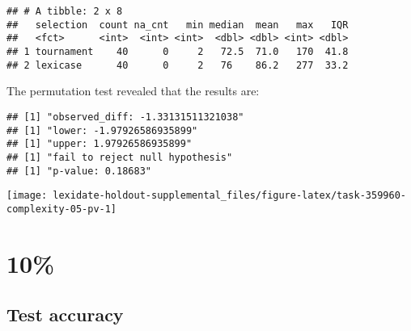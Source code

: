 \documentclass[
]{book}
\newenvironment{Shaded}{\begin{snugshade}}{\end{snugshade}}
\newcommand{\AttributeTok}[1]{\textcolor[rgb]{0.13,0.29,0.53}{#1}}
\newcommand{\DecValTok}[1]{\textcolor[rgb]{0.00,0.00,0.81}{#1}}
\newcommand{\FunctionTok}[1]{\textcolor[rgb]{0.13,0.29,0.53}{\textbf{#1}}}
\newcommand{\NormalTok}[1]{#1}
\newcommand{\OtherTok}[1]{\textcolor[rgb]{0.56,0.35,0.01}{#1}}
\newcommand{\SpecialCharTok}[1]{\textcolor[rgb]{0.81,0.36,0.00}{\textbf{#1}}}
\newcommand{\StringTok}[1]{\textcolor[rgb]{0.31,0.60,0.02}{#1}}
\begin{document}
\begin{verbatim}
## # A tibble: 2 x 8
##   selection  count na_cnt   min median  mean   max   IQR
##   <fct>      <int>  <int> <int>  <dbl> <dbl> <int> <dbl>
## 1 tournament    40      0     2   72.5  71.0   170  41.8
## 2 lexicase      40      0     2   76    86.2   277  33.2
\end{verbatim}

The permutation test revealed that the results are:

\begin{Shaded}
\end{Shaded}

\begin{verbatim}
## [1] "observed_diff: -1.33131511321038"
## [1] "lower: -1.97926586935899"
## [1] "upper: 1.97926586935899"
## [1] "fail to reject null hypothesis"
## [1] "p-value: 0.18683"
\end{verbatim}

\texttt{[image: lexidate-holdout-supplemental\_files/figure-latex/task-359960-complexity-05-pv-1]}

\hypertarget{section-46}{%
\section{10\%}\label{section-46}}

\hypertarget{test-accuracy-46}{%
\subsection{Test accuracy}\label{test-accuracy-46}}
\end{document}
